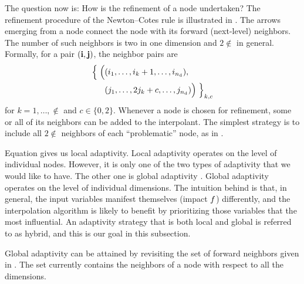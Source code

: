 The question now is: How is the refinement of a node undertaken? The refinement
procedure of the Newton--Cotes rule is illustrated in . The arrows
emerging from a node connect the node with its forward (next-level) neighbors.
The number of such neighbors is two in one dimension and $2 \nin$ in general.
Formally, for a pair $(\mathbf{i}, \mathbf{j})$, the neighbor pairs are
\begin{align}
  \left\{\vphantom{\Big(}\right. \Big( &(i_1, \dots,   i_k + 1, \dots, i_\nin), \elab{neighbors} \\
                                       &(j_1, \dots, 2 j_k + c, \dots, j_\nin) \Big) \left.\vphantom{\Big)} \right\}_{k, c} \nonumber
\end{align}
for $k = 1, \dots, \nin$ and $c \in \{ 0, 2 \}$. Whenever a node is chosen for
refinement, some or all of its neighbors can be added to the interpolant. The
simplest strategy is to include all $2 \nin$ neighbors of each ``problematic''
node, as in \cite{ma2009}.

Equation  gives us local adaptivity. Local adaptivity operates on
the level of individual nodes. However, it is only one of the two types of
adaptivity that we would like to have. The other one is global adaptivity
\cite{klimke2006}. Global adaptivity operates on the level of individual
dimensions. The intuition behind is that, in general, the input variables
manifest themselves (impact $f$) differently, and the interpolation algorithm
is likely to benefit by prioritizing those variables that the most influential.
An adaptivity strategy that is both local and global is referred to as hybrid,
and this is our goal in this subsection.

Global adaptivity can be attained by revisiting the set of forward neighbors
given in . The set currently contains the neighbors of a node
with respect to all the dimensions.
